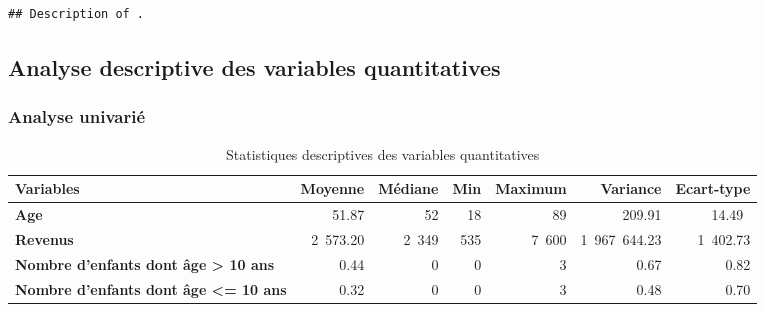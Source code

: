 \documentclass[11pt,a4paper, x11names]{article}\usepackage[]{graphicx}\usepackage[]{color}
\makeatletter
\newenvironment{kframe}{%
 \def\at@end@of@kframe{}%
 \ifinner\ifhmode%
  \def\at@end@of@kframe{\end{minipage}}%
  \begin{minipage}{\columnwidth}%
 \fi\fi%
 \def\FrameCommand##1{\hskip\@totalleftmargin \hskip-\fboxsep
 \colorbox{shadecolor}{##1}\hskip-\fboxsep
     \hskip-\linewidth \hskip-\@totalleftmargin \hskip\columnwidth}%
 \MakeFramed {\advance\hsize-\width
   \@totalleftmargin\z@ \linewidth\hsize
   \@setminipage}}%
 {\par\unskip\endMakeFramed%
 \at@end@of@kframe}
\newenvironment{knitrout}{}{} %
\makeatother
\begin{document}
\begin{knitrout}
\color{fgcolor}\begin{kframe}
\begin{verbatim}
## Description of .
\end{verbatim}
\end{kframe}
\end{knitrout}

\subsection{Analyse descriptive des variables quantitatives }
\subsubsection{Analyse univarié}

\begin{table}[!h] \centering
\begin{small}
\begin{tabular}{@{}lrrrrrr@{}}\toprule
\textbf{Variables}& \textbf{Moyenne} & \textbf{Médiane}& \textbf{Min} & \textbf{Maximum} & \textbf{Variance} & \textbf{Ecart-type} \\ \midrule
\textbf{Age}          & 51.87 &  52 & 18 & 89 & 209.91 & 14.49\ \\ \hdashline
\textbf{Revenus}      & 2~573.20 & 2~349 & 535&7~600 & 1~967~644.23&1~402.73   \\ \hdashline
\textbf{Nombre d'enfants dont âge > 10 ans} &  0.44 & 0 & 0 & 3 & 0.67 & 0.82  \\  \hdashline
\textbf{Nombre d'enfants dont âge <= 10 ans} &  0.32 & 0 & 0 & 3 & 0.48 & 0.70 \\
\bottomrule
\end{tabular}
\end{small}
\caption{Statistiques descriptives des variables quantitatives}
\end{table}



\end{document}
